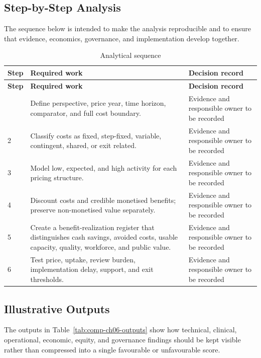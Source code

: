 \subsection{Step-by-Step Analysis}
The sequence below is intended to make the analysis reproducible and to ensure
that evidence, economics, governance, and implementation develop together.

\begin{longtable}{@{}p{}p{}p{}@{}}
\caption{Analytical sequence}
\label{tab:comp-ch06-analysis-steps}\\
\toprule
\textbf{Step} & \textbf{Required work} & \textbf{Decision record} \\
\midrule
\endfirsthead
\toprule
\textbf{Step} & \textbf{Required work} & \textbf{Decision record} \\
\midrule
\endhead
\bottomrule
\endlastfoot
1 & Define perspective, price year, time horizon, comparator, and full cost boundary. & Evidence and responsible owner to be recorded \\
2 & Classify costs as fixed, step-fixed, variable, contingent, shared, or exit related. & Evidence and responsible owner to be recorded \\
3 & Model low, expected, and high activity for each pricing structure. & Evidence and responsible owner to be recorded \\
4 & Discount costs and credible monetised benefits; preserve non-monetised value separately. & Evidence and responsible owner to be recorded \\
5 & Create a benefit-realization register that distinguishes cash savings, avoided costs, usable capacity, quality, workforce, and public value. & Evidence and responsible owner to be recorded \\
6 & Test price, uptake, review burden, implementation delay, support, and exit thresholds. & Evidence and responsible owner to be recorded \\
\end{longtable}

\subsection{Illustrative Outputs}
The outputs in Table~\ref{tab:comp-ch06-outputs} show how technical,
clinical, operational, economic, equity, and governance findings should be kept
visible rather than compressed into a single favourable or unfavourable score.

